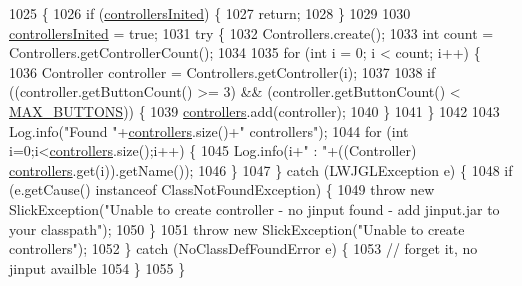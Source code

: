 \begin{DoxyCode}
1025                                                         \{
1026         \textcolor{keywordflow}{if} (\mbox{\hyperlink{classorg_1_1newdawn_1_1slick_1_1_input_ae782bdb973c10fd66f1d71dee393e506}{controllersInited}}) \{
1027             \textcolor{keywordflow}{return};
1028         \}
1029         
1030         \mbox{\hyperlink{classorg_1_1newdawn_1_1slick_1_1_input_ae782bdb973c10fd66f1d71dee393e506}{controllersInited}} = \textcolor{keyword}{true};
1031         \textcolor{keywordflow}{try} \{
1032             Controllers.create();
1033             \textcolor{keywordtype}{int} count = Controllers.getControllerCount();
1034             
1035             \textcolor{keywordflow}{for} (\textcolor{keywordtype}{int} i = 0; i < count; i++) \{
1036                 Controller controller = Controllers.getController(i);
1037 
1038                 \textcolor{keywordflow}{if} ((controller.getButtonCount() >= 3) && (controller.getButtonCount() < 
      \mbox{\hyperlink{classorg_1_1newdawn_1_1slick_1_1_input_a2c2eabdc1cc7e21483aed750421861b1}{MAX\_BUTTONS}})) \{
1039                     \mbox{\hyperlink{classorg_1_1newdawn_1_1slick_1_1_input_a1bcc91bf0db9efc578bd934a8ed9ce67}{controllers}}.add(controller);
1040                 \}
1041             \}
1042             
1043             Log.info(\textcolor{stringliteral}{"Found "}+\mbox{\hyperlink{classorg_1_1newdawn_1_1slick_1_1_input_a1bcc91bf0db9efc578bd934a8ed9ce67}{controllers}}.size()+\textcolor{stringliteral}{" controllers"});
1044             \textcolor{keywordflow}{for} (\textcolor{keywordtype}{int} i=0;i<\mbox{\hyperlink{classorg_1_1newdawn_1_1slick_1_1_input_a1bcc91bf0db9efc578bd934a8ed9ce67}{controllers}}.size();i++) \{
1045                 Log.info(i+\textcolor{stringliteral}{" : "}+((Controller) \mbox{\hyperlink{classorg_1_1newdawn_1_1slick_1_1_input_a1bcc91bf0db9efc578bd934a8ed9ce67}{controllers}}.get(i)).getName());
1046             \}
1047         \} \textcolor{keywordflow}{catch} (LWJGLException e) \{
1048             \textcolor{keywordflow}{if} (e.getCause() instanceof ClassNotFoundException) \{
1049                 \textcolor{keywordflow}{throw} \textcolor{keyword}{new} SlickException(\textcolor{stringliteral}{"Unable to create controller - no jinput found - add jinput.jar to
       your classpath"});
1050             \}
1051             \textcolor{keywordflow}{throw} \textcolor{keyword}{new} SlickException(\textcolor{stringliteral}{"Unable to create controllers"});
1052         \} \textcolor{keywordflow}{catch} (NoClassDefFoundError e) \{
1053             \textcolor{comment}{// forget it, no jinput availble}
1054         \}
1055     \}
\end{DoxyCode}
\mbox{\label{classorg_1_1newdawn_1_1slick_1_1_input_af5ec91d4dcd5ab3a675007a6db8ab785}} 

